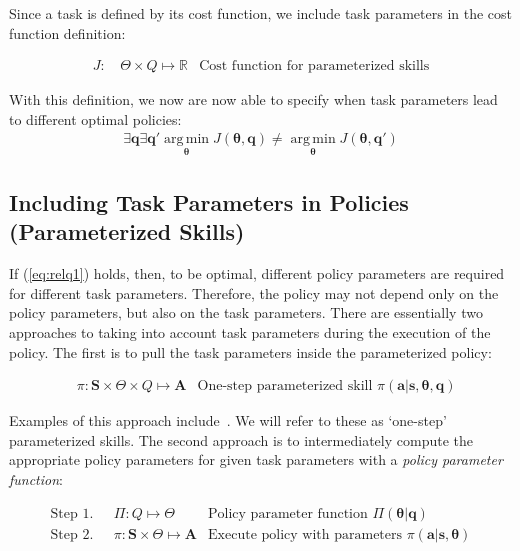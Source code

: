 \documentclass[12pt]{article}
\newcommand{\mymath}[1]{\ensuremath{#1}\xspace}
\newcommand{\pol}    {\mymath{\pi}}
\newcommand{\act}    {\mymath{\mathbf{a}}}
\newcommand{\actsp}  {\mymath{\mathbf{A}}}
\newcommand{\sta}    {\mymath{\mathbf{s}}}
\newcommand{\stasp}  {\mymath{\mathbf{S}}}
\newcommand{\app}    {\mymath{\bm{\theta}}}
\newcommand{\appsp}  {\mymath{\Theta}}
\newcommand{\polg}   {\mymath{\Pi}}
\newcommand{\taskp}  {\mymath{\mathbf{q}}}
\newcommand{\taskpsp}{\mymath{Q}}
\newcommand{\costf}  {\mymath{J}}
\DeclareMathOperator*{\argmin}{arg\,min}
\newcommand{\argminvar}[1]{\ensuremath{\underset{#1}{{\argmin}}}}
\begin{document}
Since a task is defined by its cost function, we include task parameters in the cost function definition:

\begin{align}
\costf\mbox{: } &\label{eq:cost_task} \appsp \times \taskpsp \mapsto \mathbb{R}&\mbox{Cost function for parameterized skills}
\end{align}

With this definition, we now are now able to specify when task parameters lead to different optimal policies:
%
\begin{align}
\label{eq:relq1} \exists \taskp \exists \taskp' \argminvar{\app}\costf(\app,\taskp) \neq \argminvar{\app}\costf(\app,\taskp')
\end{align}
%

\subsection{Including Task Parameters in Policies (Parameterized Skills)}

If (\ref{eq:relq1}) holds, then, to be optimal, different policy parameters are required for different task parameters. Therefore, the policy may not depend only on the policy parameters, but also on the task parameters. 
There are essentially two approaches to taking into account task parameters during the execution of the policy. The first is to pull the task parameters inside the parameterized policy:

\begin{align}
& \pol: \stasp\times\appsp\times\taskpsp \mapsto \actsp & \mbox{One-step parameterized skill $\pol(\act|\sta,\app,\taskp)$}
\end{align}

Examples of this approach include~\cite{matsubara11learning,  stulp13learning}. We will refer to these as `one-step' parameterized skills. The second approach is to intermediately compute the appropriate policy parameters for given task parameters with a \emph{policy parameter function}:

\begin{align}
\mbox{Step 1.~~}&\polg:\taskpsp\mapsto\appsp & \mbox{Policy parameter function~} \polg(\app|\taskp)\label{eq:pol_par_fun}\\
\mbox{Step 2.~~}&\pol:\stasp\times\appsp\mapsto\actsp & \mbox{Execute policy with parameters~}  \pol(\act|\sta,\app)
\end{align}
\end{document}
